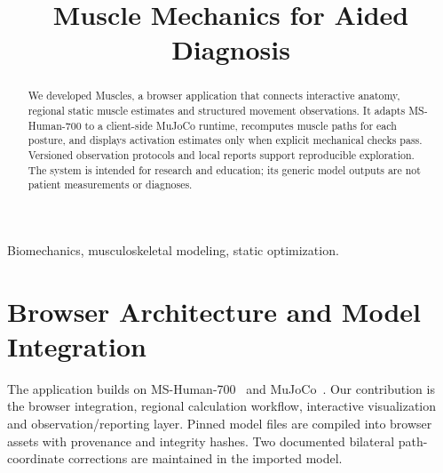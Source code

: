 

\title{Muscle Mechanics for Aided Diagnosis}
\author{
}
\date{}


\maketitle

\begin{abstract}
We developed Muscles, a browser application that connects interactive anatomy,
regional static muscle estimates and structured movement observations. It
adapts MS-Human-700 to a client-side MuJoCo runtime, recomputes muscle paths for
each posture, and displays activation estimates only when explicit mechanical
checks pass. Versioned observation protocols and local reports support
reproducible exploration. The system is intended for research and education;
its generic model outputs are not patient measurements or diagnoses.
\end{abstract}

\begin{IEEEkeywords}
Biomechanics, musculoskeletal modeling, static optimization.
\end{IEEEkeywords}

\balance
\section{Browser Architecture and Model Integration}
The application builds on MS-Human-700~\cite{zuo2024self} and
MuJoCo~\cite{mujoco}. Our contribution is the browser integration, regional
calculation workflow, interactive visualization and observation/reporting
layer. Pinned model files are compiled into browser assets with provenance
and integrity hashes. Two documented bilateral path-coordinate corrections
are maintained in the imported model.

